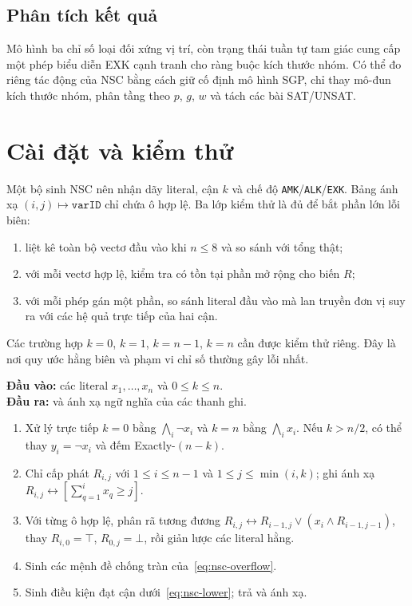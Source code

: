 \subsection{Phân tích kết quả}

Mô hình ba chỉ số loại đối xứng vị trí, còn trạng thái tuần tự tam giác cung
cấp một phép biểu diễn EXK cạnh tranh cho ràng buộc kích thước nhóm. Có thể đo
riêng tác động của NSC bằng cách giữ cố định mô hình SGP, chỉ thay mô-đun kích
thước nhóm, phân tầng theo \(p\), \(g\), \(w\) và tách các bài SAT/UNSAT.

\section{Cài đặt và kiểm thử}

Một bộ sinh NSC nên nhận dãy literal, cận \(k\) và chế độ
\texttt{AMK}/\texttt{ALK}/\texttt{EXK}. Bảng ánh xạ
\((i,j)\mapsto\texttt{varID}\) chỉ chứa ô hợp lệ. Ba lớp kiểm thử là đủ để bắt
phần lớn lỗi biên:

\begin{enumerate}
  \item liệt kê toàn bộ vectơ đầu vào khi \(n\le8\) và so sánh với tổng thật;
  \item với mỗi vectơ hợp lệ, kiểm tra có tồn tại phần mở rộng cho biến \(R\);
  \item với mỗi phép gán một phần, so sánh literal đầu vào mà lan truyền đơn vị
  suy ra với các hệ quả trực tiếp của hai cận.
\end{enumerate}

Các trường hợp \(k=0\), \(k=1\), \(k=n-1\), \(k=n\) cần được kiểm thử riêng. Đây là nơi
quy ước hằng biên và phạm vi chỉ số thường gây lỗi nhất.

\begin{algorithm}[H]
\caption{Sinh NSC cho ràng buộc đúng \(K\)}
\label{alg:nsc}
\begin{minipage}{.94\textwidth}\small
\textbf{Đầu vào:} các literal \(x_1,\ldots,x_n\) và \(0\le k\le n\).\\
\textbf{Đầu ra:} \CNF và ánh xạ ngữ nghĩa của các thanh ghi.
\begin{enumerate}
  \item Xử lý trực tiếp \(k=0\) bằng \(\bigwedge_i\neg x_i\) và \(k=n\)
  bằng \(\bigwedge_i x_i\). Nếu \(k>n/2\), có thể thay
  \(y_i=\neg x_i\) và đếm Exactly-\((n-k)\).
  \item Chỉ cấp phát \(R_{i,j}\) với \(1\le i\le n-1\) và
  \(1\le j\le\min(i,k)\); ghi ánh xạ
  \(R_{i,j}\leftrightarrow[\sum_{q=1}^{i}x_q\ge j]\).
  \item Với từng ô hợp lệ, phân rã tương đương
  \(R_{i,j}\leftrightarrow
    R_{i-1,j}\lor(x_i\land R_{i-1,j-1})\),
  thay \(R_{i,0}=\top\), \(R_{0,j}=\bot\), rồi giản lược các literal hằng.
  \item Sinh các mệnh đề chống tràn của~\eqref{eq:nsc-overflow}.
  \item Sinh điều kiện đạt cận dưới~\eqref{eq:nsc-lower}; trả \CNF và ánh xạ.
\end{enumerate}
\end{minipage}
\end{algorithm}

